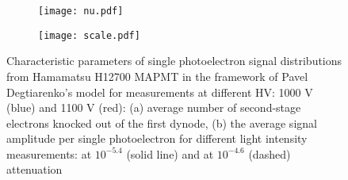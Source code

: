 \begin{figure}[b]
	\centering
	\begin{subfigure}{0.48\linewidth}
	\texttt{[image: nu.pdf]}
	\caption{}
	\label{fig:nu}

	\end{subfigure}
	\begin{subfigure}{0.48\linewidth}
	\texttt{[image: scale.pdf]}
	\caption{}
	\label{fig:scale}
	\end{subfigure}

	\caption{Characteristic parameters of single photoelectron signal distributions from Hamamatsu H12700 MAPMT in the framework of Pavel Degtiarenko's model for measurements at different HV: 1000 V (blue) and 1100 V (red):
		(a) average number of second-stage electrons knocked out of the first dynode,
		(b) the average signal amplitude per single photoelectron for different light intensity measurements: at $10^{-5.4}$ (solid line) and at $10^{-4.6}$ (dashed) attenuation}
	\label{fig:characteristicPars}
\end{figure}


